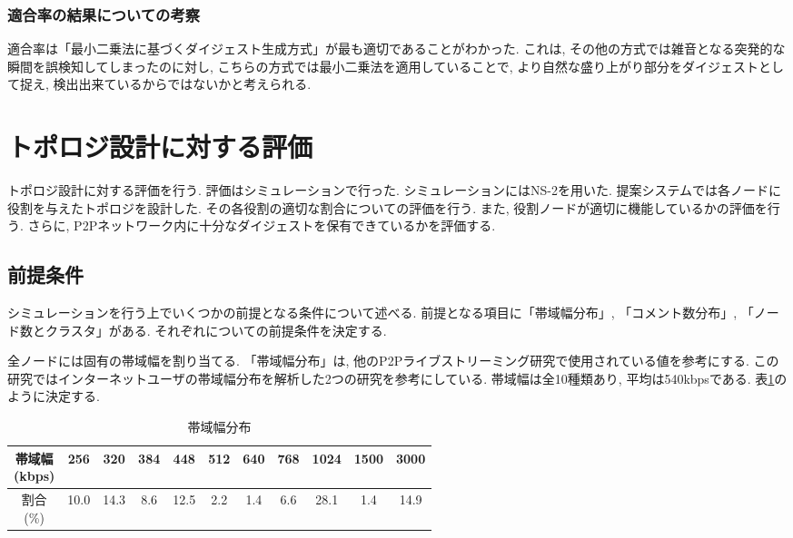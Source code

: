 \subsubsection{適合率の結果についての考察}
適合率は「最小二乗法に基づくダイジェスト生成方式」が最も適切であることがわかった. これは, その他の方式では雑音となる突発的な瞬間を誤検知してしまったのに対し, こちらの方式では最小二乗法を適用していることで, より自然な盛り上がり部分をダイジェストとして捉え, 検出出来ているからではないかと考えられる.

\section{トポロジ設計に対する評価}
トポロジ設計に対する評価を行う. 評価はシミュレーションで行った. シミュレーションにはNS-2を用いた. 提案システムでは各ノードに役割を与えたトポロジを設計した. その各役割の適切な割合についての評価を行う. また, 役割ノードが適切に機能しているかの評価を行う. さらに, P2Pネットワーク内に十分なダイジェストを保有できているかを評価する.

\subsection{前提条件}
シミュレーションを行う上でいくつかの前提となる条件について述べる. 前提となる項目に「帯域幅分布」, 「コメント数分布」, 「ノード数とクラスタ」がある. それぞれについての前提条件を決定する.

全ノードには固有の帯域幅を割り当てる.
「帯域幅分布」は, 他のP2Pライブストリーミング研究\cite{band-dist}で使用されている値を参考にする. この研究ではインターネットユーザの帯域幅分布を解析した2つの研究\cite{band-dist-1}\cite{band-dist-2}を参考にしている. 帯域幅は全10種類あり, 平均は540kbpsである. 表\ref{tbl:band-dist}のように決定する.

\begin{table}[h]
  \caption{帯域幅分布}
  \label{tbl:band-dist}
  \centering
      {\small
        \begin{tabular}{|c|c|c|c|c|c|c|c|c|c|c|} \hline
          \shortstack{帯域幅 \\ (kbps)} & 256 & 320 & 384 & 448 & 512 & 640 & 768 & 1024 & 1500 & 3000 \\ \hline
          \shortstack{割合 \\ (\%)} & 10.0 & 14.3 & 8.6 & 12.5 & 2.2 & 1.4 & 6.6 & 28.1 & 1.4 & 14.9 \\ \hline
        \end{tabular}
      }
\end{table}


